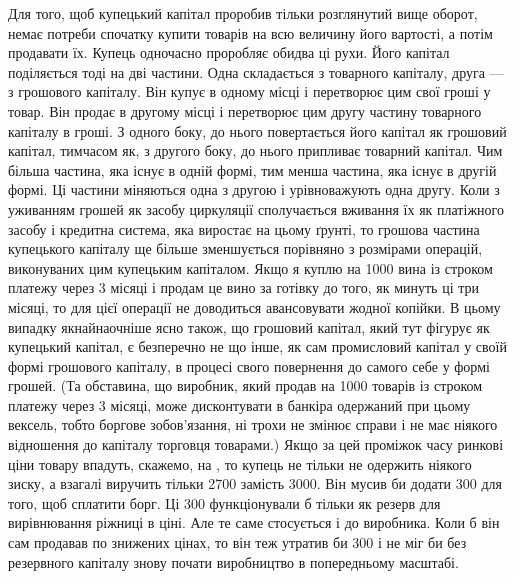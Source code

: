 Для того, щоб купецький капітал проробив тільки розглянутий
вище оборот, немає потреби спочатку купити товарів на
всю величину його вартості, а потім продавати їх. Купець одночасно
проробляє обидва ці рухи. Його капітал поділяється тоді
на дві частини. Одна складається з товарного капіталу, друга —
з грошового капіталу. Він купує в одному місці і перетворює
цим свої гроші у товар. Він продає в другому місці і перетворює
цим другу частину товарного капіталу в гроші. З одного
боку, до нього повертається його капітал як грошовий капітал,
тимчасом як, з другого боку, до нього припливає товарний капітал.
Чим більша частина, яка існує в одній формі, тим менша
частина, яка існує в другій формі. Ці частини міняються одна
з другою і урівноважують одна другу. Коли з уживанням грошей
як засобу циркуляції сполучається вживання їх як платіжного
засобу і кредитна система, яка виростає на цьому ґрунті, то
грошова частина купецького капіталу ще більше зменшується порівняно
з розмірами операцій, виконуваних цим купецьким капіталом.
Якщо я куплю на 1000 вина із строком
платежу через 3 місяці і продам це вино за готівку до того, як
минуть ці три місяці, то для цієї операції не доводиться авансовувати
жодної копійки. В цьому випадку якнайнаочніше ясно
також, що грошовий капітал, який тут фігурує як купецький
капітал, є безперечно не що інше, як сам промисловий капітал
у своїй формі грошового капіталу, в процесі свого повернення
до самого себе у формі грошей. (Та обставина, що виробник,
який продав на 1000 товарів із строком платежу
через 3 місяці, може дисконтувати в банкіра одержаний при цьому
вексель, тобто боргове зобов’язання, ні трохи не змінює справи
і не має ніякого відношення до капіталу торговця товарами.)
Якщо за цей проміжок часу ринкові ціни товару впадуть,
скажемо, на , то купець не тільки не одержить ніякого
зиску, а взагалі виручить тільки 2700 замість
3000. Він мусив би додати 300
для того, щоб сплатити борг. Ці 300
функціонували б тільки як резерв для вирівнювання ріжниці в
ціні. Але те саме стосується і до виробника. Коли б він сам продавав
по знижених цінах, то він теж утратив би 300
і не міг би без резервного капіталу знову почати виробництво
в попередньому масштабі.


